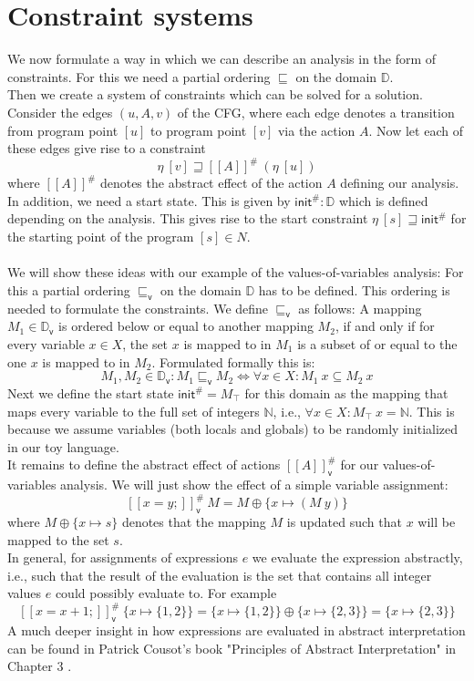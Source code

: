   \section{Constraint systems}
    We now formulate a way in which we can describe an analysis in the form of constraints. For this we need a partial ordering $\sqsubseteq$ on the domain $\mathbb{D}$.\\
    Then we create a system of constraints which can be solved for a solution. Consider the edges $(u, A, v)$ of the \ac{CFG}, where each edge denotes a transition from program point $[u]$ to program point $[v]$ via the action $A$. Now let each of these edges give rise to a constraint
    \[\eta\ [v] \sqsupseteq [\![A]\!]^{\#}\ (\eta\ [u])\]
    where $[\![A]\!]^{\#}$ denotes the abstract effect of the action $A$ defining our analysis. In addition, we need a start state. This is given by $\textsf{init}^{\#}: \mathbb{D}$ which is defined depending on the analysis. This gives rise to the start constraint $\eta\ [s] \sqsupseteq \textsf{init}^{\#}$ for the starting point of the program $[s] \in N$.\\
    \\
    We will show these ideas with our example of the values-of-variables analysis: For this a partial ordering $\sqsubseteq_\textsf{v}$ on the domain $\mathbb{D}$ has to be defined. This ordering is needed to formulate the constraints. We define $\sqsubseteq_\textsf{v}$ as follows: A mapping $M_1 \in \mathbb{D}_\textsf{v}$ is ordered below or equal to another mapping $M_2$, if and only if for every variable $x \in X$, the set $x$ is mapped to in $M_1$ is a subset of or equal to the one $x$ is mapped to in $M_2$. Formulated formally this is:
    \[M_1, M_2 \in \mathbb{D}_\textsf{v}: M_1 \sqsubseteq_\textsf{v} M_2 \Longleftrightarrow \forall x \in X: M_1\ x \subseteq M_2\ x\]
    Next we define the start state $\textsf{init}^{\#} = M_\top$ for this domain as the mapping that maps every variable to the full set of integers $\mathbb{N}$, i.e., $\forall x \in X: M_\top\ x = \mathbb{N}$. This is because we assume variables (both locals and globals) to be randomly initialized in our toy language.\\
    It remains to define the abstract effect of actions $[\![A]\!]^{\#}_\textsf{v}$ for our values-of-variables analysis. We will just show the effect of a simple variable assignment:
    \[ [\![ x=y; ]\!]^{\#}_\textsf{v}\ M = M \oplus \{x \mapsto (M\ y) \} \]
    where $M \oplus \{x \mapsto s\}$ denotes that the mapping $M$ is updated such that $x$ will be mapped to the set $s$.\\
    In general, for assignments of expressions $e$ we evaluate the expression abstractly, i.e., such that the result of the evaluation is the set that contains all integer values $e$ could possibly evaluate to. For example 
    \[ [\![ x=x+1; ]\!]^{\#}_\textsf{v}\ \{x \mapsto \{1,2\}\} = \{x \mapsto \{1,2\}\} \oplus \{x \mapsto \{2,3\}\} = \{x \mapsto \{2,3\}\}\]
    A much deeper insight in how expressions are evaluated in abstract interpretation can be found in Patrick Cousot's book "Principles of Abstract Interpretation" in Chapter 3 \parencite{cousot2021principles}.

